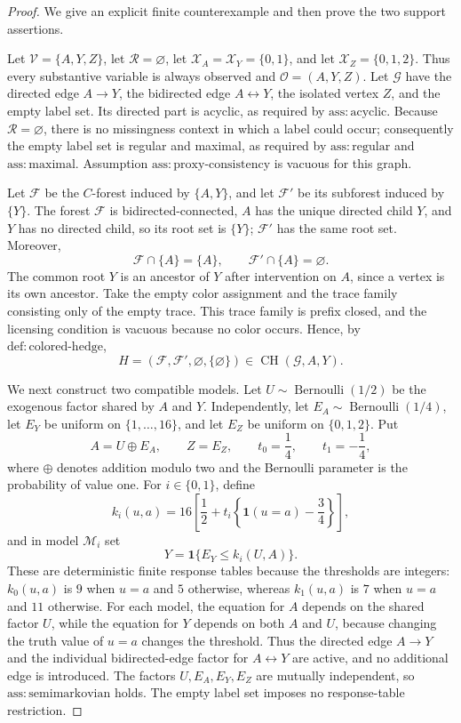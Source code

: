 \documentclass{article}
\begin{document}
\begin{proof}
We give an explicit finite counterexample and then prove the two support assertions.

Let \(\mathcal V=\{A,Y,Z\}\), let \(\mathcal R=\varnothing\), let \(\mathcal X_A=\mathcal X_Y=\{0,1\}\), and let \(\mathcal X_Z=\{0,1,2\}\). Thus every substantive variable is always observed and \(\mathcal O=(A,Y,Z)\). Let \(\mathcal G\) have the directed edge \(A\to Y\), the bidirected edge \(A\leftrightarrow Y\), the isolated vertex \(Z\), and the empty label set. Its directed part is acyclic, as required by \(\mathrm{ass{:}acyclic}\). Because \(\mathcal R=\varnothing\), there is no missingness context in which a label could occur; consequently the empty label set is regular and maximal, as required by \(\mathrm{ass{:}regular}\) and \(\mathrm{ass{:}maximal}\). Assumption \(\mathrm{ass{:}proxy\text{-}consistency}\) is vacuous for this graph.

Let \(\mathcal F\) be the \(C\)-forest induced by \(\{A,Y\}\), and let \(\mathcal F'\) be its subforest induced by \(\{Y\}\). The forest \(\mathcal F\) is bidirected-connected, \(A\) has the unique directed child \(Y\), and \(Y\) has no directed child, so its root set is \(\{Y\}\); \(\mathcal F'\) has the same root set. Moreover,
\[
 \mathcal F\cap\{A\}=\{A\},
 \qquad
 \mathcal F'\cap\{A\}=\varnothing.
\]
The common root \(Y\) is an ancestor of \(Y\) after intervention on \(A\), since a vertex is its own ancestor. Take the empty color assignment and the trace family consisting only of the empty trace. This trace family is prefix closed, and the licensing condition is vacuous because no color occurs. Hence, by \(\mathrm{def{:}colored\text{-}hedge}\),
\[
 H=(\mathcal F,\mathcal F',\varnothing,\{\varnothing\})
 \in \operatorname{CH}(\mathcal G,A,Y).
\]

We next construct two compatible models. Let \(U\sim\operatorname{Bernoulli}(1/2)\) be the exogenous factor shared by \(A\) and \(Y\). Independently, let \(E_A\sim\operatorname{Bernoulli}(1/4)\), let \(E_Y\) be uniform on \(\{1,\ldots,16\}\), and let \(E_Z\) be uniform on \(\{0,1,2\}\). Put
\[
 A=U\mathbin{\oplus}E_A,
 \qquad
 Z=E_Z,
 \qquad
 t_0=\frac14,
 \qquad
 t_1=-\frac14,
\]
where \(\oplus\) denotes addition modulo two and the Bernoulli parameter is the probability of value one. For \(i\in\{0,1\}\), define
\[
 k_i(u,a)
 =16\left[\frac12+t_i\left\{\mathbf 1(u=a)-\frac34\right\}\right],
\]
and in model \(\mathcal M_i\) set
\[
 Y=\mathbf 1\{E_Y\leq k_i(U,A)\}.
\]
These are deterministic finite response tables because the thresholds are integers: \(k_0(u,a)\) is \(9\) when \(u=a\) and \(5\) otherwise, whereas \(k_1(u,a)\) is \(7\) when \(u=a\) and \(11\) otherwise. For each model, the equation for \(A\) depends on the shared factor \(U\), while the equation for \(Y\) depends on both \(A\) and \(U\), because changing the truth value of \(u=a\) changes the threshold. Thus the directed edge \(A\to Y\) and the individual bidirected-edge factor for \(A\leftrightarrow Y\) are active, and no additional edge is introduced. The factors \(U,E_A,E_Y,E_Z\) are mutually independent, so \(\mathrm{ass{:}semimarkovian}\) holds. The empty label set imposes no response-table restriction.


\end{proof}
\end{document}
